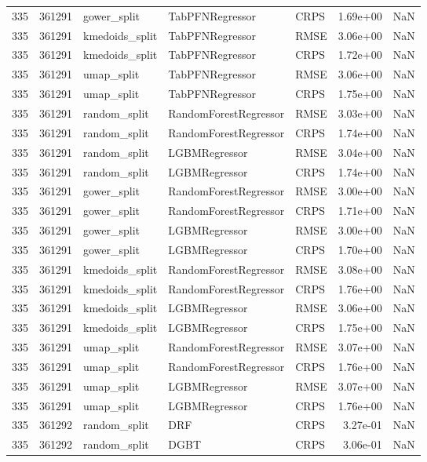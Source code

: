 \begin{tabular}{rrlllrr}
335 & 361291 & gower\_split & TabPFNRegressor & CRPS & 1.69e+00 & NaN \\
335 & 361291 & kmedoids\_split & TabPFNRegressor & RMSE & 3.06e+00 & NaN \\
335 & 361291 & kmedoids\_split & TabPFNRegressor & CRPS & 1.72e+00 & NaN \\
335 & 361291 & umap\_split & TabPFNRegressor & RMSE & 3.06e+00 & NaN \\
335 & 361291 & umap\_split & TabPFNRegressor & CRPS & 1.75e+00 & NaN \\
335 & 361291 & random\_split & RandomForestRegressor & RMSE & 3.03e+00 & NaN \\
335 & 361291 & random\_split & RandomForestRegressor & CRPS & 1.74e+00 & NaN \\
335 & 361291 & random\_split & LGBMRegressor & RMSE & 3.04e+00 & NaN \\
335 & 361291 & random\_split & LGBMRegressor & CRPS & 1.74e+00 & NaN \\
335 & 361291 & gower\_split & RandomForestRegressor & RMSE & 3.00e+00 & NaN \\
335 & 361291 & gower\_split & RandomForestRegressor & CRPS & 1.71e+00 & NaN \\
335 & 361291 & gower\_split & LGBMRegressor & RMSE & 3.00e+00 & NaN \\
335 & 361291 & gower\_split & LGBMRegressor & CRPS & 1.70e+00 & NaN \\
335 & 361291 & kmedoids\_split & RandomForestRegressor & RMSE & 3.08e+00 & NaN \\
335 & 361291 & kmedoids\_split & RandomForestRegressor & CRPS & 1.76e+00 & NaN \\
335 & 361291 & kmedoids\_split & LGBMRegressor & RMSE & 3.06e+00 & NaN \\
335 & 361291 & kmedoids\_split & LGBMRegressor & CRPS & 1.75e+00 & NaN \\
335 & 361291 & umap\_split & RandomForestRegressor & RMSE & 3.07e+00 & NaN \\
335 & 361291 & umap\_split & RandomForestRegressor & CRPS & 1.76e+00 & NaN \\
335 & 361291 & umap\_split & LGBMRegressor & RMSE & 3.07e+00 & NaN \\
335 & 361291 & umap\_split & LGBMRegressor & CRPS & 1.76e+00 & NaN \\
335 & 361292 & random\_split & DRF & CRPS & 3.27e-01 & NaN \\
335 & 361292 & random\_split & DGBT & CRPS & 3.06e-01 & NaN \\

\end{tabular}
